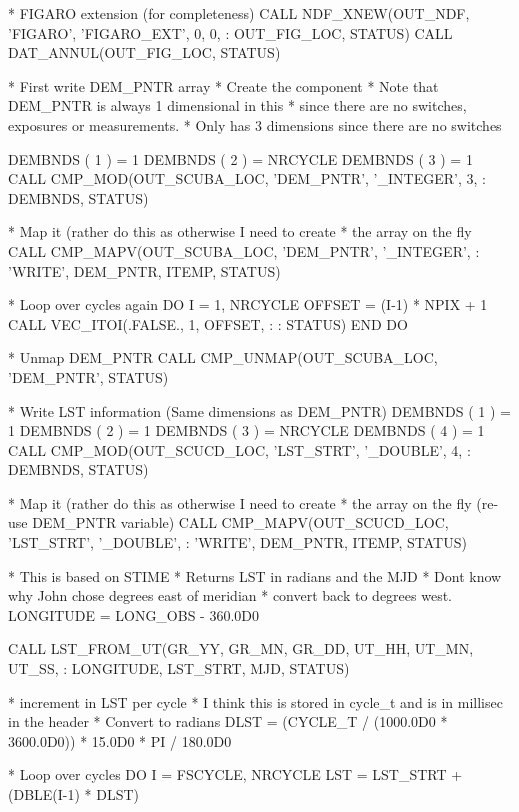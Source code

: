 \documentclass[twoside,11pt,nolof]{starlink}
\begin{document}
\begin{small}
\begin{terminalv}
*     FIGARO extension (for completeness)
      CALL NDF_XNEW(OUT_NDF, 'FIGARO', 'FIGARO_EXT', 0, 0,
     :     OUT_FIG_LOC, STATUS)
      CALL DAT_ANNUL(OUT_FIG_LOC, STATUS)

*     First write DEM_PNTR array
*     Create the component
*     Note that DEM_PNTR is always 1 dimensional in this
*     since there are no switches, exposures or measurements.
*     Only has 3 dimensions since there are no switches

      DEMBNDS ( 1 ) = 1
      DEMBNDS ( 2 ) = NRCYCLE
      DEMBNDS ( 3 ) = 1
      CALL CMP_MOD(OUT_SCUBA_LOC, 'DEM_PNTR', '_INTEGER', 3,
     :     DEMBNDS, STATUS)

*     Map it (rather do this as otherwise I need to create
*     the array on the fly
      CALL CMP_MAPV(OUT_SCUBA_LOC, 'DEM_PNTR', '_INTEGER',
     :     'WRITE', DEM_PNTR, ITEMP, STATUS)

*     Loop over cycles again
      DO I = 1, NRCYCLE
         OFFSET = (I-1) * NPIX + 1
         CALL VEC_ITOI(.FALSE., 1, OFFSET,
     :        %
     :        STATUS)
      END DO

*     Unmap DEM_PNTR
      CALL CMP_UNMAP(OUT_SCUBA_LOC, 'DEM_PNTR', STATUS)

*     Write LST information (Same dimensions as DEM_PNTR)
      DEMBNDS ( 1 ) = 1
      DEMBNDS ( 2 ) = 1
      DEMBNDS ( 3 ) = NRCYCLE
      DEMBNDS ( 4 ) = 1
      CALL CMP_MOD(OUT_SCUCD_LOC, 'LST_STRT', '_DOUBLE', 4,
     :     DEMBNDS, STATUS)

*     Map it (rather do this as otherwise I need to create
*     the array on the fly (re-use DEM_PNTR variable)
      CALL CMP_MAPV(OUT_SCUCD_LOC, 'LST_STRT', '_DOUBLE',
     :     'WRITE', DEM_PNTR, ITEMP, STATUS)

*     This is based on STIME
*     Returns LST in radians and the MJD
*     Dont know why John chose degrees east of meridian
*     convert back to degrees west.
      LONGITUDE =  LONG_OBS - 360.0D0

      CALL LST_FROM_UT(GR_YY, GR_MN, GR_DD, UT_HH, UT_MN, UT_SS,
     :     LONGITUDE, LST_STRT, MJD, STATUS)

*     increment in LST per cycle
*     I think this is stored in cycle_t and is in millisec in the header
*     Convert to radians
      DLST = (CYCLE_T / (1000.0D0 * 3600.0D0)) * 15.0D0 * PI / 180.0D0

*     Loop over cycles
      DO I = FSCYCLE, NRCYCLE
         LST = LST_STRT + (DBLE(I-1) * DLST)


\end{terminalv}
\end{small}
\end{document}
